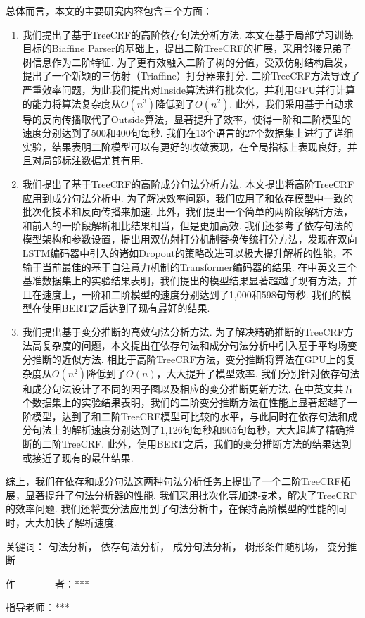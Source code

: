 \begin{cabstract}
	总体而言，本文的主要研究内容包含三个方面：
	\begin{enumerate}
		\item 我们提出了基于TreeCRF的高阶依存句法分析方法.
		      本文在基于局部学习训练目标的Biaffine Parser的基础上，提出二阶TreeCRF的扩展，采用邻接兄弟子树信息作为二阶特征.
		      为了更有效融入二阶子树的分值，受双仿射结构启发，提出了一个新颖的三仿射（Triaffine）打分器来打分.
		      二阶TreeCRF方法导致了严重效率问题，为此我们提出对Inside算法进行批次化，并利用GPU并行计算的能力将算法复杂度从$O(n^3)$降低到了$O(n^2)$.
		      此外，我们采用基于自动求导的反向传播取代了Outside算法，显著提升了效率，使得一阶和二阶模型的速度分别达到了500和400句每秒.
		      我们在13个语言的27个数据集上进行了详细实验，结果表明二阶模型可以有更好的收敛表现，在全局指标上表现良好，并且对局部标注数据尤其有用.
		\item 我们提出了基于TreeCRF的高阶成分句法分析方法.
		      本文提出将高阶TreeCRF应用到成分句法分析中.
		      为了解决效率问题，我们应用了和依存模型中一致的批次化技术和反向传播来加速.
		      此外，我们提出一个简单的两阶段解析方法，和前人的一阶段解析相比结果相当，但是更加高效.
		      我们还参考了依存句法的模型架构和参数设置，提出用双仿射打分机制替换传统打分方法，发现在双向LSTM编码器中引入的诸如Dropout的策略改进可以极大提升解析的性能，不输于当前最佳的基于自注意力机制的Transformer编码器的结果.
		      在中英文三个基准数据集上的实验结果表明，我们提出的模型结果显著超越了现有方法，并且在速度上，一阶和二阶模型的速度分别达到了1,000和598句每秒.
		      我们的模型在使用BERT之后达到了现有最好的结果.
		\item 我们提出基于变分推断的高效句法分析方法.
		      为了解决精确推断的TreeCRF方法高复杂度的问题，本文提出在依存句法和成分句法分析中引入基于平均场变分推断的近似方法.
		      相比于高阶TreeCRF方法，变分推断将算法在GPU上的复杂度从$O(n^2)$降低到了$O(n)$，大大提升了模型效率.
		      我们分别针对依存句法和成分句法设计了不同的因子图以及相应的变分推断更新方法.
		      在中英文共五个数据集上的实验结果表明，我们的二阶变分推断方法在性能上显著超越了一阶模型，达到了和二阶TreeCRF模型可比较的水平，与此同时在依存句法和成分句法上的解析速度分别达到了1,126句每秒和905句每秒，大大超越了精确推断的二阶TreeCRF.
		      此外，使用BERT之后，我们的变分推断方法的结果达到或接近了现有的最佳结果.
	\end{enumerate}
	
	综上，我们在依存和成分句法这两种句法分析任务上提出了一个二阶TreeCRF拓展，显著提升了句法分析器的性能.
	我们采用批次化等加速技术，解决了TreeCRF的效率问题.
	我们还将变分法应用到了句法分析中，在保持高阶模型的性能的同时，大大加快了解析速度.
	
	\vskip 21bp
	{\heiti{} 关键词：}
	句法分析，
	依存句法分析，
	成分句法分析，
	树形条件随机场，
	变分推断
	
	\begin{flushright}
		作~~~~~~~~者：***
		
		指导老师：***
		
	\end{flushright}
\end{cabstract}


